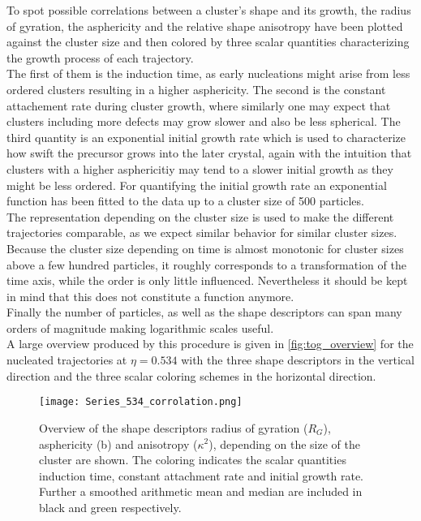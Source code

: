 To spot possible correlations between a cluster's shape and its growth, the radius of gyration, the asphericity and the relative shape anisotropy have been plotted against the cluster size and then colored by three scalar quantities characterizing the growth process of each trajectory.\\ 
The first of them is the induction time, as early nucleations might arise from less ordered clusters resulting in a higher asphericity. The second is the constant attachement rate during cluster growth, where similarly one may expect that clusters including more defects may grow slower and also be less spherical. The third quantity is an exponential initial growth rate which is used to characterize how swift the precursor grows into the later crystal, again with the intuition that clusters with a higher asphericitiy may tend to a slower initial growth as they might be less ordered. For quantifying the initial growth rate an exponential function has been fitted to the data up to a cluster size of 500 particles.\\
The representation depending on the cluster size is used to make the different trajectories comparable, as we expect similar behavior for similar cluster sizes. Because the cluster size depending on time is almost monotonic for cluster sizes above a few hundred particles, it roughly corresponds to a transformation of the time axis, while the order is only little influenced. Nevertheless it should be kept in mind that this does not constitute a function anymore.\\
Finally the number of particles, as well as the shape descriptors can span many orders of magnitude making logarithmic scales useful.\\

A large overview produced by this procedure is given in \autoref{fig:tog_overview} for the nucleated trajectories at $\eta=0.534$ with the three shape descriptors in the vertical direction and the three scalar coloring schemes in the horizontal direction.\\

\begin{figure}[!h]
\centering
\texttt{[image: Series\_534\_corrolation.png]}
\caption[Tensor of gyration measurements from production data]{Overview of the shape descriptors radius of gyration ($R_G$), asphericity (b) and anisotropy ($\kappa^2$), depending on the size of the cluster are shown. The coloring indicates the scalar quantities induction time, constant attachment rate and initial growth rate. Further a smoothed arithmetic mean and median are included in black and green respectively.}
\label{fig:tog_overview}
\end{figure}

